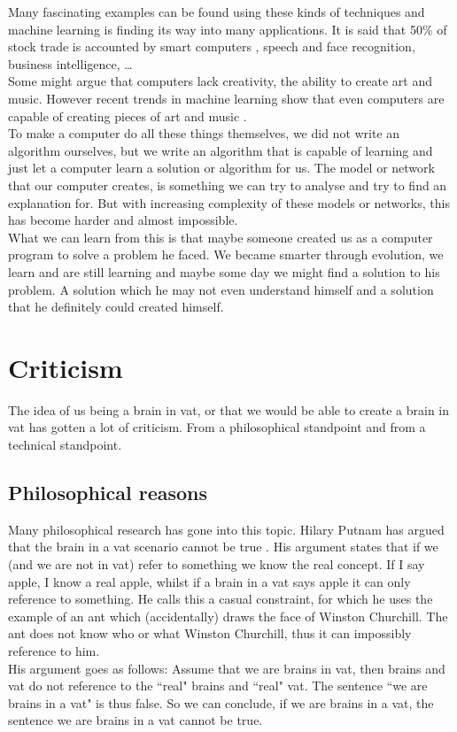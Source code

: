 \documentclass[a4paper]{article}
\begin{document}
Many fascinating examples can be found using these kinds of techniques and machine learning is finding its way into many applications. It is said that 50\% of stock trade is accounted by smart computers \cite{Stocks}, speech and face recognition, business intelligence, \dots\\
Some might argue that computers lack creativity, the ability to create art and music. However recent trends in machine learning show that even computers are capable of creating pieces of art and music \cite{music}.\\
To make a computer do all these things themselves, we did not write an algorithm ourselves, but we write an algorithm that is capable of learning and just let a computer learn a solution or algorithm for us. The model or network that our computer creates, is something we can try to analyse and try to find an explanation for. But with increasing complexity of these models or networks, this has become harder and almost impossible.\\
What we can learn from this is that maybe someone created us as a computer program to solve a problem he faced. We became smarter through evolution, we learn and are still learning and maybe some day we might find a solution to his problem. A solution which he may not even understand himself and a solution that he definitely could created himself.
 
 
\section{Criticism}
The idea of us being a brain in vat, or that we would be able to create a brain in vat has gotten a lot of criticism. From a philosophical standpoint and from a technical standpoint.

\subsection{Philosophical reasons}
Many philosophical research has gone into this topic. Hilary Putnam has argued that the brain in a vat scenario cannot be true \cite{Putnam}. His argument states that if we (and we are not in vat) refer to something we know the real concept. If I say apple, I know a real apple, whilst if a brain in a vat says apple it can only reference to something. He calls this a casual constraint, for which he uses the example of an ant which (accidentally) draws the face of Winston Churchill. The ant does not know who or what Winston Churchill, thus it can impossibly reference to him.\\
His argument goes as follows: Assume that we are brains in vat, then brains and vat do not reference to the ``real" brains and ``real" vat. The sentence ``we are brains in a vat" is thus false. So we can conclude, if we are brains in a vat, the sentence we are brains in a vat cannot be true.
\end{document}
